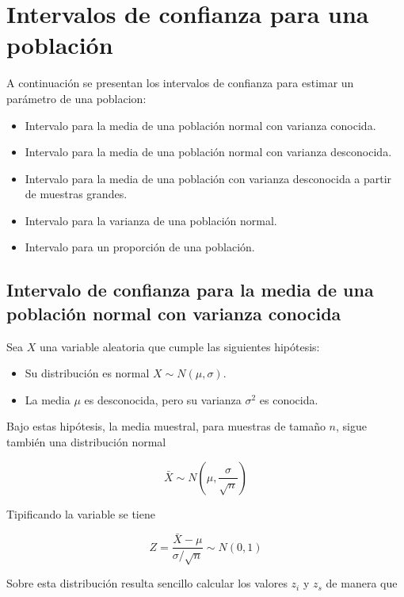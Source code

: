 \documentclass[
  a4paper,
]{scrreport}
\providecommand{\tightlist}{%
  \setlength{\itemsep}{0pt}\setlength{\parskip}{0pt}}\usepackage{longtable,booktabs,array}
\theoremstyle{plain}
\theoremstyle{definition}
\theoremstyle{definition}
\theoremstyle{remark}
\begin{document}
\section{Intervalos de confianza para una
población}\label{intervalos-de-confianza-para-una-poblaciuxf3n}

A continuación se presentan los intervalos de confianza para estimar un
parámetro de una poblacion:

\begin{itemize}
\tightlist
\item
  Intervalo para la media de una población normal con varianza conocida.
\item
  Intervalo para la media de una población normal con varianza
  desconocida.
\item
  Intervalo para la media de una población con varianza desconocida a
  partir de muestras grandes.
\item
  Intervalo para la varianza de una población normal.
\item
  Intervalo para un proporción de una población.
\end{itemize}

\subsection{Intervalo de confianza para la media de una población normal
con varianza
conocida}\label{intervalo-de-confianza-para-la-media-de-una-poblaciuxf3n-normal-con-varianza-conocida}

Sea \(X\) una variable aleatoria que cumple las siguientes hipótesis:

\begin{itemize}
\tightlist
\item
  Su distribución es normal \(X\sim N(\mu,\sigma)\).
\item
  La media \(\mu\) es desconocida, pero su varianza \(\sigma^2\) es
  conocida.
\end{itemize}

Bajo estas hipótesis, la media muestral, para muestras de tamaño \(n\),
sigue también una distribución normal

\[
\bar X \sim N\left(\mu,\frac{\sigma}{\sqrt n}\right)
\]

Tipificando la variable se tiene

\[
Z=\frac{\bar X-\mu}{\sigma/\sqrt n} \sim N(0,1)
\]

Sobre esta distribución resulta sencillo calcular los valores \(z_i\) y
\(z_s\) de manera que
\end{document}
